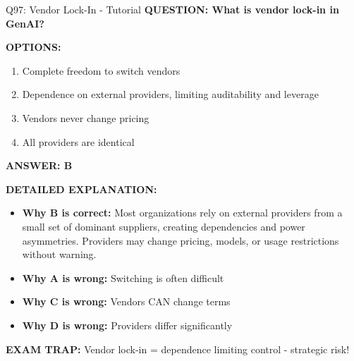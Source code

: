 \documentclass[8pt]{beamer}
\begin{document}
	\begin{frame}{Q97: Vendor Lock-In - Tutorial}
		\fontsize{6.5}{7.5}\selectfont
		\textbf{QUESTION: What is vendor lock-in in GenAI?}
		
		\vspace{0.1cm}
		\textbf{OPTIONS:}
		\begin{enumerate}
			\item Complete freedom to switch vendors
			\item Dependence on external providers, limiting auditability and leverage
			\item Vendors never change pricing
			\item All providers are identical
		\end{enumerate}
		
		\vspace{0.1cm}
		\textcolor{myblue}{\textbf{ANSWER: B}}
		
		\vspace{0.1cm}
		\textbf{DETAILED EXPLANATION:}
		\begin{itemize}
			\item \textbf{Why B is correct:} Most organizations rely on external providers from a small set of dominant suppliers, creating dependencies and power asymmetries. Providers may change pricing, models, or usage restrictions without warning.
			\item \textbf{Why A is wrong:} Switching is often difficult
			\item \textbf{Why C is wrong:} Vendors CAN change terms
			\item \textbf{Why D is wrong:} Providers differ significantly
		\end{itemize}
		
		\textcolor{myred}{\textbf{EXAM TRAP:}} Vendor lock-in = \textcolor{myblue}{dependence limiting control} - strategic risk!
	\end{frame}
	
\end{document}
